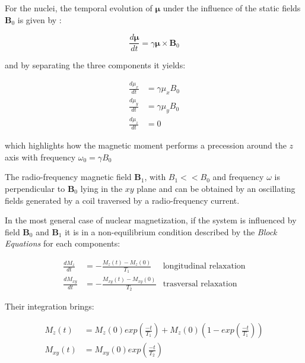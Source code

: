 \documentclass[12pt,a4paper]{report}
\begin{document}
For the nuclei, the temporal evolution of $\bm{\mu}$ under the influence of the static fields $\bm{B}_0$ is given by :

\begin{equation}
  \frac{d \bm{\mu}}{d t} = \gamma \bm{\mu} \times \bm{B}_0
\end{equation}

and by separating the three components it yields:

\begin{align}
  \frac{d \mu_x}{d t} &= \gamma \mu_x B_0 \\ 
  \frac{d \mu_y}{d t} &= \gamma \mu_y B_0 \\
  \frac{d \mu_z}{d t} &= 0
\end{align}

which highlights how the magnetic moment performs a precession around the $z$ axis with frequency $\omega_0 = \gamma B_0$

The radio-frequency magnetic field $\bm{B}_1$, with $B_1 << B_0$ and frequency $\omega$ is perpendicular to $\bm{B}_0$ lying in the $xy$ plane and can be obtained by an oscillating fields generated by a coil traversed by a radio-frequency current.

In the most general case of nuclear magnetization, if the system is influenced by field $\bm{B}_0$ and $\bm{B}_1$ it is in a non-equilibrium condition described by the {\it Block Equations} for each components:

\begin{align}
 \frac{d M_{z}}{d t}  &= - \frac{M_z(t) - M_z(0)}{T_1} & \mbox{longitudinal relaxation}\\
 \frac{d M_{xy}}{d t} &= - \frac{M_{xy}(t) - M_{xy}(0)}{T_2} & \mbox{trasversal relaxation}
\end{align}

Their integration brings: 

\begin{align}
 M_z(t)    &= M_z(0)exp\left(\frac{-t}{T_1}\right) + M_z(0)\left(1 - exp\left(\frac{-t}{T_1}\right)\right) \\
 M_{xy}(t) &= M_{xy}(0)exp\left(\frac{-t}{T_2}\right)
\end{align}
\end{document}
